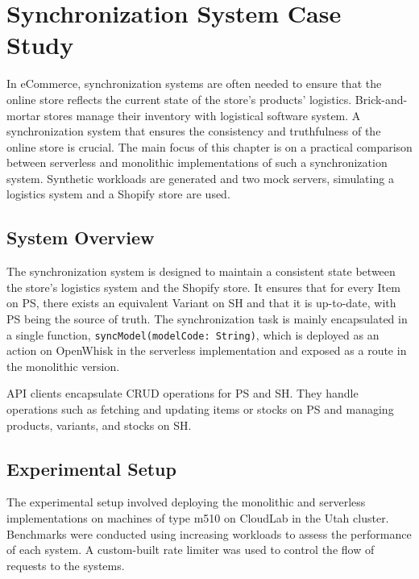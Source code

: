 \chapter{Synchronization System Case Study}
\etocsettocstyle{\rule{\textwidth}{1pt}}{\rule{\textwidth}{1pt}} %
\localtableofcontents
\label{chap:synchronization}

In eCommerce, synchronization systems are often needed to ensure that the online store reflects the current state of the store's products' logistics. Brick-and-mortar stores manage their inventory with logistical software system. A synchronization system that ensures the consistency and truthfulness of the online store is crucial.
The main focus of this chapter is on a practical comparison between serverless and monolithic implementations of such a synchronization system. Synthetic workloads are generated and two mock servers, simulating a logistics system and a Shopify store are used.

\section{System Overview}

The synchronization system is designed to maintain a consistent state between the store's logistics system and the Shopify store. It ensures that for every Item on PS, there exists an equivalent Variant on SH and that it is up-to-date, with PS being the source of truth. The synchronization task is mainly encapsulated in a single function, \texttt{syncModel(modelCode: String)}, which is deployed as an action on OpenWhisk in the serverless implementation and exposed as a route in the monolithic version.

API clients encapsulate CRUD operations for PS and SH. They handle operations such as fetching and updating items or stocks on PS and managing products, variants, and stocks on SH. 

\section{Experimental Setup}

The experimental setup involved deploying the monolithic and serverless implementations on machines of type m510 on CloudLab in the Utah cluster. Benchmarks were conducted using increasing workloads to assess the performance of each system. A custom-built rate limiter was used to control the flow of requests to the systems.

